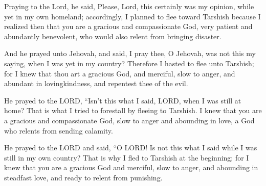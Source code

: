 			\begin{versebox}
					\item[BHS] 
					\item[LXX] 
					\item[AB 1990 270] Praying to the Lord, he said, Please, Lord, this certainly was my opinion, while yet in my own homeland; accordingly, I planned to flee toward Tarshish because I realized then that you are a gracious and compassionate God, very patient and abundantly benevolent, who would also relent from bringing disaster.
					\item[ASV] And he prayed unto Jehovah, and said, I pray thee, O Jehovah, was not this my saying, when I was yet in my country? Therefore I hasted to flee unto Tarshish; for I knew that thou art a gracious God, and merciful, slow to anger, and abundant in lovingkindness, and repentest thee of the evil.
					\item[NIV] He prayed to the LORD, “Isn’t this what I said, LORD, when I was still at home? That is what I tried to forestall by fleeing to Tarshish. I knew that you are a gracious and compassionate God, slow to anger and abounding in love, a God who relents from sending calamity.
					\item[NRSV] He prayed to the LORD and said, “O LORD! Is not this what I said while I was still in my own country? That is why I fled to Tarshish at the beginning; for I knew that you are a gracious God and merciful, slow to anger, and abounding in steadfast love, and ready to relent from punishing.
			\end{versebox}

